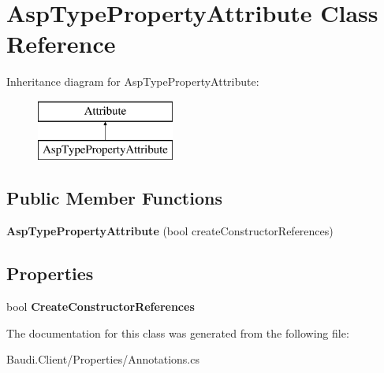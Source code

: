 \hypertarget{class_asp_type_property_attribute}{}\section{Asp\+Type\+Property\+Attribute Class Reference}
\label{class_asp_type_property_attribute}
Inheritance diagram for Asp\+Type\+Property\+Attribute\+:\begin{figure}[H]
\begin{center}
\leavevmode
\includegraphics[height=2.000000cm]{class_asp_type_property_attribute}
\end{center}
\end{figure}
\subsection*{Public Member Functions}
\begin{DoxyCompactItemize}
\item 
\hypertarget{class_asp_type_property_attribute_a44e918652832a5c2272af6b3c85d12d1}{}{\bfseries Asp\+Type\+Property\+Attribute} (bool create\+Constructor\+References)\label{class_asp_type_property_attribute_a44e918652832a5c2272af6b3c85d12d1}

\end{DoxyCompactItemize}
\subsection*{Properties}
\begin{DoxyCompactItemize}
\item 
\hypertarget{class_asp_type_property_attribute_a57bbcf991d77058648e6292b63726241}{}bool {\bfseries Create\+Constructor\+References}\label{class_asp_type_property_attribute_a57bbcf991d77058648e6292b63726241}

\end{DoxyCompactItemize}


The documentation for this class was generated from the following file\+:\begin{DoxyCompactItemize}
\item 
Baudi.\+Client/\+Properties/Annotations.\+cs\end{DoxyCompactItemize}
